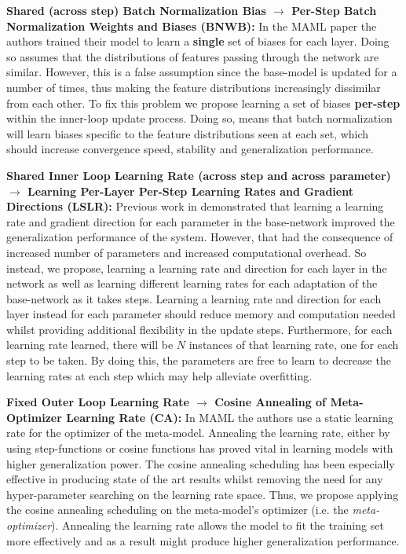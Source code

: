 \documentclass{article} \usepackage[dvipsnames]{xcolor}
\begin{document}
\textbf{Shared (across step) Batch Normalization Bias $\rightarrow$ Per-Step Batch Normalization Weights and Biases (BNWB):} In the MAML paper the authors trained their model to learn a \textbf{single} set of biases for each layer. Doing so assumes that the distributions of features passing through the network are similar. However, this is a false assumption since the base-model is updated for a number of times, thus making the feature distributions increasingly dissimilar from each other. To fix this problem we propose learning a set of biases \textbf{per-step} within the inner-loop update process. Doing so, means that batch normalization will learn biases specific to the feature distributions seen at each set, which should increase convergence speed, stability and generalization performance.

\textbf{Shared Inner Loop Learning Rate (across step and across parameter) $\rightarrow$ Learning Per-Layer Per-Step Learning Rates and Gradient Directions (LSLR):} Previous work in \cite{li2017meta} demonstrated that learning a learning rate and gradient direction for each parameter in the base-network improved the generalization performance of the system. However, that had the consequence of increased number of parameters and increased computational overhead. So instead, we propose, learning a learning rate and direction for each layer in the network as well as learning different learning rates for each adaptation of the base-network as it takes steps. Learning a learning rate and direction for each layer instead for each parameter should reduce memory and computation needed whilst providing additional flexibility in the update steps. Furthermore, for each learning rate learned, there will be $N$ instances of that learning rate, one for each step to be taken. By doing this, the parameters are free to learn to decrease the learning rates at each step which may help alleviate overfitting.

\textbf{Fixed Outer Loop Learning Rate $\rightarrow$ Cosine Annealing of Meta-Optimizer Learning Rate (CA):} In MAML the authors use a static learning rate for the optimizer of the meta-model. Annealing the learning rate, either by using step-functions \citep{he2016deep} or cosine functions \citep{loshchilov2016sgdr} has proved vital in learning models with higher generalization power. The cosine annealing scheduling has been especially effective in producing state of the art results whilst removing the need for any hyper-parameter searching on the learning rate space. Thus, we propose applying the cosine annealing scheduling on the meta-model's optimizer (i.e. the \emph{meta-optimizer}). Annealing the learning rate allows the model to fit the training set more effectively and as a result might produce higher generalization performance.
\end{document}
